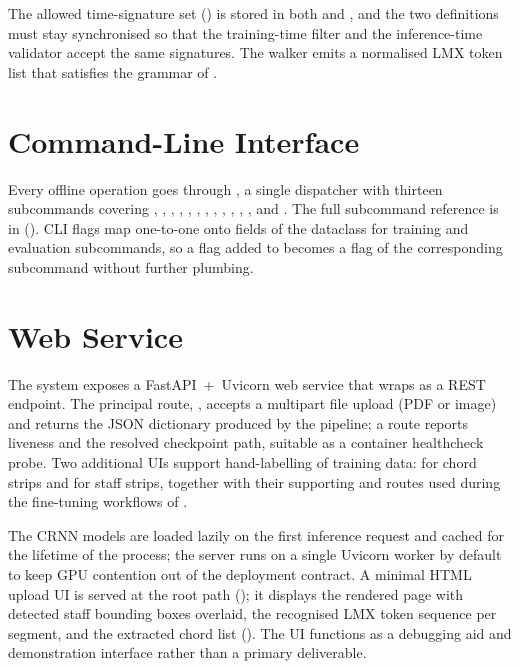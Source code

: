 The allowed time-signature set
() is stored in
both  and
, and the two definitions must
stay synchronised so that the training-time filter and the
inference-time validator accept the same signatures.
The walker emits a normalised LMX token list that satisfies the
grammar of .

\section{Command-Line Interface}
\label{sec:impl-cli}

Every offline operation goes through , a single
 dispatcher with thirteen subcommands covering
, , , ,
, , , ,
, , ,
, and .
The full subcommand reference is in 
().
CLI flags map one-to-one onto fields of the  dataclass for
training and evaluation subcommands, so a flag added to 
becomes a flag of the corresponding subcommand without further
plumbing.

\section{Web Service}
\label{sec:impl-api}

The system exposes a FastAPI~+~Uvicorn web service that wraps
 as a REST endpoint.
The principal route, , accepts a
multipart file upload (PDF or image) and returns the JSON dictionary
produced by the pipeline; a  route reports
liveness and the resolved checkpoint path, suitable as a container
healthcheck probe.
Two additional UIs support hand-labelling of training data:
 for chord strips and  for staff
strips, together with their supporting  and
 routes used during the fine-tuning
workflows of .

The CRNN models are loaded lazily on the first inference request and
cached for the lifetime of the process; the server runs on a single
Uvicorn worker by default to keep GPU contention out of the deployment
contract.
A minimal HTML upload UI is served at the root path ();
it displays the rendered page with detected staff bounding boxes
overlaid, the recognised LMX token sequence per segment, and the
extracted chord list ().
The UI functions as a debugging aid and demonstration interface rather
than a primary deliverable.

